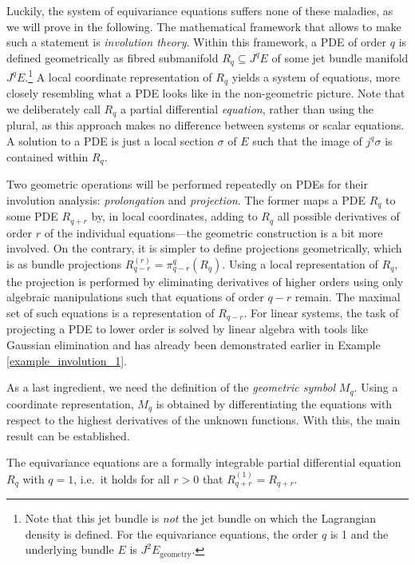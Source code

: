 Luckily, the system of equivariance equations suffers none of these maladies, as we will prove in the following. The mathematical framework that allows to make such a statement is \emph{involution theory}\cite{Seiler_2010}. Within this framework, a PDE of order $q$ is defined geometrically as fibred submanifold $R_q\subseteq J^qE$ of some jet bundle manifold $J^qE$.\footnote{Note that this jet bundle is \emph{not} the jet bundle on which the Lagrangian density is defined. For the equivariance equations, the order $q$ is 1 and the underlying bundle $E$ is $J^2E_\text{geometry}$.} A local coordinate representation of $R_q$ yields a system of equations, more closely resembling what a PDE looks like in the non-geometric picture. Note that we deliberately call $R_q$ a partial differential \emph{equation}, rather than using the plural, as this approach makes no difference between systems or scalar equations. A solution to a PDE is just a local section $\sigma$ of $E$ such that the image of $j^q\sigma$ is contained within $R_q$.

Two geometric operations will be performed repeatedly on PDEs for their involution analysis: \emph{prolongation} and \emph{projection}. The former maps a PDE $R_q$ to some PDE $R_{q+r}$ by, in local coordinates, adding to $R_q$ all possible derivatives of order $r$ of the individual equations---the geometric construction is a bit more involved. On the contrary, it is simpler to define projections geometrically, which is as bundle projections $R^{(r)}_{q-r} = \pi^q_{q-r}(R_q)$. Using a local representation of $R_q$, the projection is performed by eliminating derivatives of higher orders using only algebraic manipulations such that equations of order $q-r$ remain. The maximal set of such equations is a representation of $R_{q-r}$. For linear systems, the task of projecting a PDE to lower order is solved by linear algebra with tools like Gaussian elimination and has already been demonstrated earlier in Example \ref{example_involution_1}.

As a last ingredient, we need the definition of the \emph{geometric symbol} $M_q$. Using a coordinate representation, $M_q$ is obtained by differentiating the equations with respect to the highest derivatives of the unknown functions. With this, the main result can be established.

\begin{theorem}\label{thm_formal_integrability}
  The equivariance equations are a formally integrable partial differential equation $R_q$ with $q=1$, i.e.~it holds for all $r>0$ that $R^{(1)}_{q+r} = R_{q+r}$.
\end{theorem}

